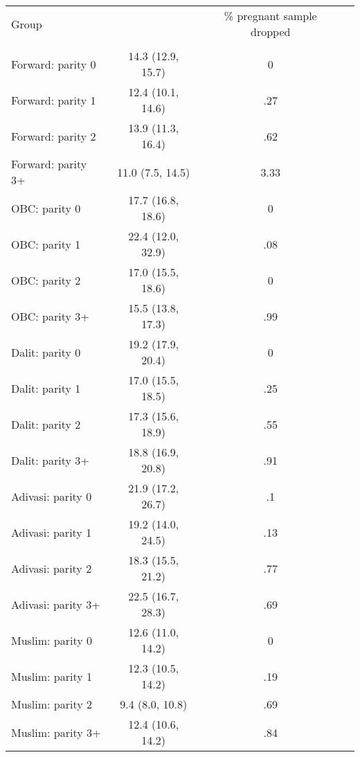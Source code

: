 \begin{tabular}{lccc}
\toprule
Group &  & \% pregnant sample dropped \\\\
\midrule
Forward: parity 0&14.3 (12.9, 15.7)&0\\
Forward: parity 1&12.4 (10.1, 14.6)&.27\\
Forward: parity 2&13.9 (11.3, 16.4)&.62\\
Forward: parity 3+&11.0 (7.5, 14.5)&3.33\\
OBC: parity 0&17.7 (16.8, 18.6)&0\\
OBC: parity 1&22.4 (12.0, 32.9)&.08\\
OBC: parity 2&17.0 (15.5, 18.6)&0\\
OBC: parity 3+&15.5 (13.8, 17.3)&.99\\
Dalit: parity 0&19.2 (17.9, 20.4)&0\\
Dalit: parity 1&17.0 (15.5, 18.5)&.25\\
Dalit: parity 2&17.3 (15.6, 18.9)&.55\\
Dalit: parity 3+&18.8 (16.9, 20.8)&.91\\
Adivasi: parity 0&21.9 (17.2, 26.7)&.1\\
Adivasi: parity 1&19.2 (14.0, 24.5)&.13\\
Adivasi: parity 2&18.3 (15.5, 21.2)&.77\\
Adivasi: parity 3+&22.5 (16.7, 28.3)&.69\\
Muslim: parity 0&12.6 (11.0, 14.2)&0\\
Muslim: parity 1&12.3 (10.5, 14.2)&.19\\
Muslim: parity 2&9.4 (8.0, 10.8)&.69\\
Muslim: parity 3+&12.4 (10.6, 14.2)&.84\\
\bottomrule
\end{tabular}
